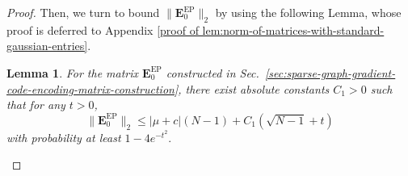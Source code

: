 \documentclass[lettersize,journal]{IEEEtran}
\newcommand{\norm}[1]{\left\lVert#1\right\rVert}
\newcommand{\GEP}{\boldsymbol{E}^{\mathrm{EP}}}
\newcommand{\gaussian}[2]{\mathcal{N}(#1, #2)}
\newtheorem{lemma}{Lemma}
\begin{document}
\begin{proof}
Then, we turn to bound $\|\GEP_0\|_2$ by using the following Lemma, whose proof is deferred to Appendix \ref{proof of lem:norm-of-matrices-with-standard-gaussian-entries}.
\begin{lemma}
\label{lem:norm-of-matrices-with-standard-gaussian-entries}
For the matrix $\GEP_0$ constructed in Sec.~\ref{sec:sparse-graph-gradient-code-encoding-matrix-construction}, there exist absolute constants
$C_1>0$ such that for any $t>0$,
\[
\|\GEP_0\|_2
\le
|\mu+c|(N-1) + C_1(\sqrt{N-1}+t)
\]
with probability at least $1-4e^{-t^2}.$
\end{lemma}


\end{proof}
\end{document}

